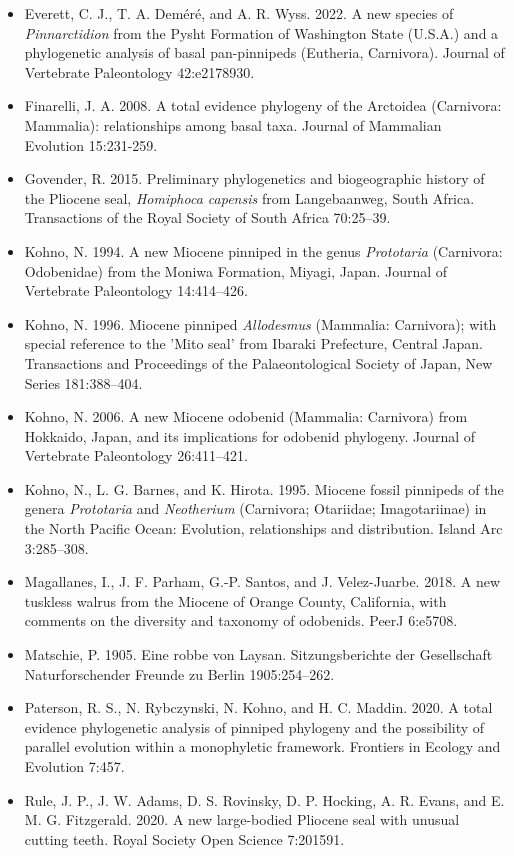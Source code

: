 \documentclass[a4paper, 12pt]{article}
\begin{document}
\begin{itemize}
\item Everett, C. J., T. A. Dem\'{e}r\'{e}, and A. R. Wyss. 2022. A new species of \textit{Pinnarctidion} from the Pysht Formation of Washington State (U.S.A.) and a phylogenetic analysis of basal pan-pinnipeds (Eutheria, Carnivora). Journal of Vertebrate Paleontology 42:e2178930. 
\item Finarelli, J. A. 2008. A total evidence phylogeny of the Arctoidea (Carnivora: Mammalia): relationships among basal taxa. Journal of Mammalian Evolution 15:231-259. 
\item Govender, R. 2015. Preliminary phylogenetics and biogeographic history of the Pliocene seal, \textit{Homiphoca capensis} from Langebaanweg, South Africa. Transactions of the Royal Society of South Africa 70:25–39.
\item Kohno, N. 1994. A new Miocene pinniped in the genus \textit{Prototaria} (Carnivora: Odobenidae) from the Moniwa Formation, Miyagi, Japan. Journal of Vertebrate Paleontology 14:414–426.
\item Kohno, N. 1996. Miocene pinniped \textit{Allodesmus} (Mammalia: Carnivora); with special reference to the 'Mito seal' from Ibaraki Prefecture, Central Japan. Transactions and Proceedings of the Palaeontological Society of Japan, New Series 181:388–404.
\item Kohno, N. 2006. A new Miocene odobenid (Mammalia: Carnivora) from Hokkaido, Japan, and its implications for odobenid phylogeny. Journal of Vertebrate Paleontology 26:411–421.
\item Kohno, N., L. G. Barnes, and K. Hirota. 1995. Miocene fossil pinnipeds of the genera \textit{Prototaria} and \textit{Neotherium} (Carnivora; Otariidae; Imagotariinae) in the North Pacific Ocean: Evolution, relationships and distribution. Island Arc 3:285–308.
\item Magallanes, I., J. F. Parham, G.-P. Santos, and J. Velez-Juarbe. 2018. A new tuskless walrus from the Miocene of Orange County, California, with comments on the diversity and taxonomy of odobenids. PeerJ 6:e5708.
\item Matschie, P. 1905. Eine robbe von Laysan. Sitzungsberichte der Gesellschaft Naturforschender Freunde zu Berlin 1905:254–262.
\item Paterson, R. S., N. Rybczynski, N. Kohno, and H. C. Maddin. 2020. A total evidence phylogenetic analysis of pinniped phylogeny and the possibility of parallel evolution within a monophyletic framework. Frontiers in Ecology and Evolution 7:457.
\item Rule, J. P., J. W. Adams, D. S. Rovinsky, D. P. Hocking, A. R. Evans, and E. M. G. Fitzgerald. 2020. A new large-bodied Pliocene seal with unusual cutting teeth. Royal Society Open Science 7:201591.

\end{itemize}
\end{document}
